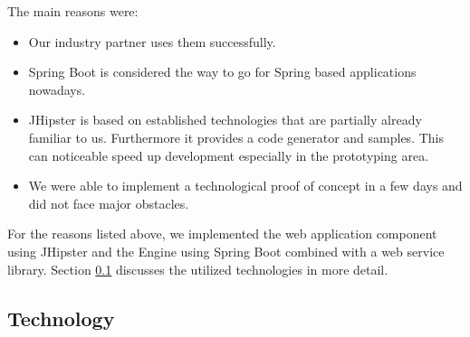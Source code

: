The main reasons were:

\begin{itemize}
\item Our industry partner uses them successfully.
\item Spring Boot is considered the way to go for Spring based applications nowadays.
\item JHipster is based on established technologies that are partially already familiar to us. Furthermore it provides a code generator and samples. This can noticeable speed up development especially in the prototyping area.
\item We were able to implement a technological proof of concept in a few days and did not face major obstacles.
\end{itemize}

For the reasons listed above, we implemented the web application component using JHipster and the Engine using Spring Boot combined with a web service library. Section \ref{subsec:technology} discusses the utilized technologies in more detail.

\subsection{Technology}
\label{subsec:technology}


